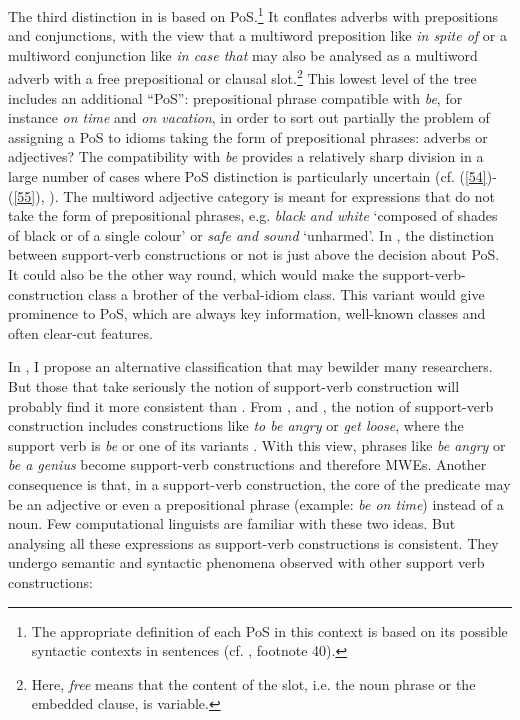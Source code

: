 \documentclass[output=paper]{langsci/langscibook}
\begin{document}
The third distinction in  is based on PoS.\footnote{The appropriate definition of each PoS in this context is based on its possible syntactic contexts in sentences (cf. , footnote 40).} It conflates adverbs with prepositions and conjunctions, with the view that a multiword preposition like \textit{in spite of} or a multiword conjunction like \textit{in case that} may also be analysed as a multiword adverb with a free prepositional or clausal slot.\footnote{ Here, \textit{free} means that the content of the slot, i.e. the noun phrase or the embedded clause, is variable.} This lowest level of the tree includes an additional “PoS”: prepositional phrase compatible with \textit{be}, for instance \textit{on time} and \textit{on vacation}, in order to sort out partially the problem of assigning a PoS to idioms taking the form of prepositional phrases: adverbs or adjectives? The compatibility with \textit{be} provides a relatively sharp division in a large number of cases where PoS distinction is particularly uncertain (cf. (\ref{54})-(\ref{55}), ). The multiword adjective category is meant for expressions that do not take the form of prepositional phrases, e.g. \textit{black and white} ‘composed of shades of black or of a single colour’ or \textit{safe and sound} ‘unharmed’. In , the distinction between support-verb constructions or not is just above the decision about PoS. It could also be the other way round, which would make the support-verb-construction class a brother of the verbal-idiom class. This variant would give prominence to PoS, which are always key information, well-known classes and often clear-cut features.

In , I propose an alternative classification that may bewilder many researchers. But those that take seriously the notion of support-verb construction will probably find it more consistent than . From \citet[34]{Gross1981}, \citet{Ranchhod1983} and \citet{Cattell1984}, the notion of support-verb construction includes constructions like \textit{to be angry} or \textit{get loose}, where the support verb is \textit{be} or one of its variants \citep[123]{Meyers2007}. With this view, phrases like \textit{be angry} or \textit{be a genius} become support-verb constructions and therefore MWEs. Another consequence is that, in a support-verb construction, the core of the predicate may be an adjective or even a prepositional phrase (example: \textit{be on time}) instead of a noun. Few computational linguists are familiar with these two ideas. But analysing all these expressions as support-verb constructions is consistent. They undergo semantic and syntactic phenomena observed with other support verb constructions:
\end{document}
